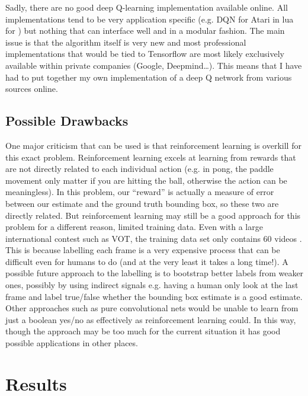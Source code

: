 \documentclass[letterpaper,12pt,titlepage,oneside,final]{book}
\begin{document}
Sadly, there are no good deep Q-learning implementation available online. All implementations tend to be very application specific (e.g. DQN for Atari in lua for \cite{atari-dqn}) but nothing that can interface well and in a modular fashion. The main issue is that the algorithm itself is very new and most professional implementations that would be tied to Tensorflow are most likely exclusively available within private companies (Google, Deepmind\dots). This means that I have had to put together my own implementation of a deep Q network from various sources online.

\section{Possible Drawbacks}
One major criticism that can be used is that reinforcement learning is overkill for this exact problem. Reinforcement learning excels at learning from rewards that are not directly related to each individual action (e.g. in pong, the paddle movement only matter if you are hitting the ball, otherwise the action can be meaningless). In this problem, our ``reward'' is actually a measure of error between our estimate and the ground truth bounding box, so these two are directly related. But reinforcement learning may still be a good approach for this problem for a different reason, limited training data. Even with a large international contest such as VOT, the training data set only contains 60 videos \cite{vot2015}. This is because labelling each frame is a very expensive process that can be difficult even for humans to do (and at the very least it takes a long time!). A possible future approach to the labelling is to bootstrap better labels from weaker ones, possibly by using indirect signals e.g. having a human only look at the last frame and label true/false whether the bounding box estimate is a good estimate. Other approaches such as pure convolutional nets would be unable to learn from just a boolean yes/no as effectively as reinforcement learning could. In this way, though the approach may be too much for the current situation it has good possible applications in other places.

\chapter{Results}
\end{document}
